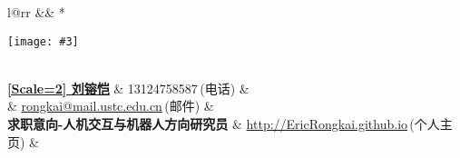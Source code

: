 \newcommand{\paint}[3]{
    \begin{minipage}{#1}
        \texttt{[image: \#3]}
    \end{minipage} 
}
\newcommand{\myheader}{
\begin{tabular*}{\textwidth}{l@{\extracolsep{\fill}}rr}
  && \multirow{4}*{\paint{2.5cm}{3cm}{./image.jpg}}\\
  \specialrule{0em}{0pt}{0pt}
  \textbf{\href{http://EricRongkai.github.io}{\CJKfontspec{微软雅黑}[Scale=2] 刘镕恺}} & 13124758587$\,${\color{labelgrey}(电话)} &\\
   & \href{mailto:zhangzc@pku.edu.cn}{rongkai@mail.ustc.edu.cn}$\,${\color{labelgrey}(邮件)} & \\
   \textbf{求职意向-人机交互与机器人方向研究员} \quad& \href{mailto:zhangzc@pku.edu.cn}{http://EricRongkai.github.io}$\, ${\color{labelgrey}(个人主页)} & \\
  \end{tabular*}\\\vspace{0.1in}
}

\myheader

